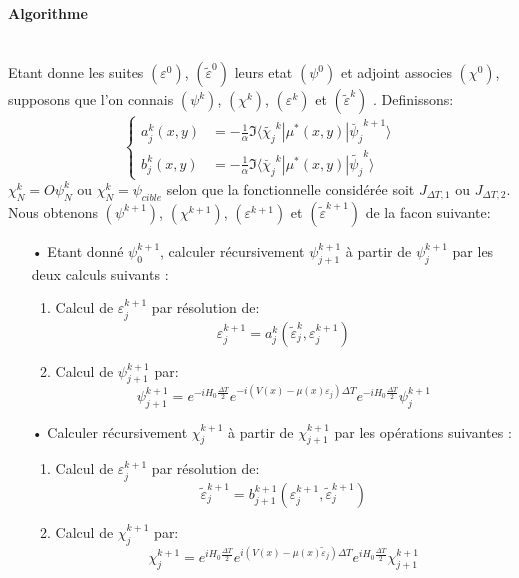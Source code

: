 \paragraph*{Algorithme}
$ $\\Etant donne les suites $(\varepsilon^0)$, $(\tilde{\varepsilon}^0)$ leurs etat $(\psi^0)$ et adjoint associes $(\chi^0)$, supposons que l'on connais $(\psi^{k})$, $(\chi^{k})$, $(\varepsilon^{k})$ et $(\tilde{\varepsilon}^{k})$ . Definissons:
\begin{equation}
\begin{cases}
a_j^k(x,y) &=-\frac{1}{\alpha} \Im \langle \tilde{\chi_j}^k|\mu^*(x,y)|\breve{\psi_j}^{k+1} \rangle \\
b_j^k(x,y) &= -\frac{1}{\alpha} \Im \langle \breve{\chi_j}^k|\mu^*(x,y)|\tilde{\psi_j}^k \rangle
\end{cases}
\end{equation}
$\chi^k_N = O\psi^k_N$ ou $ \chi_N^k = \psi_{cible} $ selon que la
fonctionnelle considérée soit $J_{\Delta T,1}$ ou $J_{\Delta T,2}$.\\
Nous obtenons $(\psi^{k+1})$, $(\chi^{k+1})$, $(\varepsilon^{k+1})$ et $(\tilde{\varepsilon}^{k+1})$ de la facon suivante:
\begin{itemize}	
	\item[•] Etant donné $\psi_0^{k+1}$, calculer récursivement $ \psi^{k+1}_{j+1}$ à partir de $\psi_j^{k+1}$ par les deux calculs suivants :
	
	\begin{enumerate}
		\item Calcul de $\varepsilon_j^{k+1}$ par résolution de:
		\begin{equation}
		\varepsilon_j^{k+1} = a_j^k(\tilde{\varepsilon}_j^k,\varepsilon_j^{k+1})
		\end{equation}
		\item Calcul de $\psi^{k+1}_{j+1}$ par:
		$$ \psi_{j+1}^{k+1} = e^{-iH_0\frac{\Delta T}{2}} e^{-i(V(x)-\mu(x)\varepsilon_j)\Delta T} e^{-iH_0\frac{\Delta T}{2}} \psi_j^{k+1}$$
	\end{enumerate}
	
	\item[•] Calculer récursivement $\chi_j^{k+1}$ à partir de $ \chi^{k+1}_{j+1} $ par les opérations suivantes :
	
	\begin{enumerate}
		\item Calcul de $\varepsilon_j^{k+1}$ par résolution de:
		\begin{equation}
		\tilde{\varepsilon}_j^{k+1} = b_{j+1}^{k+1}(\varepsilon_j^{k+1},\tilde{\varepsilon}_j^{k+1})
		\end{equation}
		\item Calcul de $\chi^{k+1}_{j}$ par:
		$$ \chi^{k+1}_{j} = e^{iH_0\frac{\Delta T}{2}} e^{i(V(x)-\mu(x)\tilde{\varepsilon}_j)\Delta T} e^{iH_0\frac{\Delta T}{2}} \chi^{k+1}_{j+1} $$
	\end{enumerate}
	
\end{itemize}

